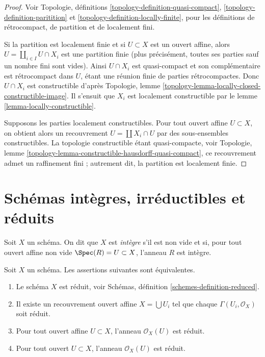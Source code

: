 \begin{proof}
Voir Topologie, définitions
\ref{topology-definition-quasi-compact},
\ref{topology-definition-paritition} et
\ref{topology-definition-locally-finite},
pour les définitions de rétrocompact, de partition et de localement fini.

\medskip\noindent
Si la partition est localement finie et si $U \subset X$ est un
ouvert affine, alors $U = \coprod_{i \in I} U \cap X_i$
est une partition finie (plus précisément, toutes ses parties sauf un nombre
fini sont vides). Ainsi $U \cap X_i$ est quasi-compact
et son complémentaire est rétrocompact dans $U$, étant une réunion finie
de parties rétrocompactes. Donc $U \cap X_i$ est constructible
d'après Topologie, lemme \ref{topology-lemma-locally-closed-constructible-image}.
Il s'ensuit que $X_i$ est localement constructible par le
lemme \ref{lemma-locally-constructible}.

\medskip\noindent
Supposons les parties localement constructibles. Pour tout ouvert
affine $U \subset X$, on obtient alors un recouvrement $U = \coprod X_i \cap U$
par des sous-ensembles constructibles. La topologie constructible étant
quasi-compacte, voir
Topologie, lemme \ref{topology-lemma-constructible-hausdorff-quasi-compact},
ce recouvrement admet un raffinement fini ; autrement dit,
la partition est localement finie.
\end{proof}

\section{Schémas intègres, irréductibles et réduits}
\label{section-integral}

\begin{definition}
\label{definition-integral}
Soit $X$ un schéma. On dit que $X$ est {\it intègre} s'il est non vide et si,
pour tout ouvert affine non vide $\Spec(R) = U \subset X$, l'anneau $R$
est intègre.
\end{definition}

\begin{lemma}
\label{lemma-characterize-reduced}
Soit $X$ un schéma.
Les assertions suivantes sont équivalentes.
\begin{enumerate}
\item Le schéma $X$ est réduit, voir
Schémas, définition \ref{schemes-definition-reduced}.
\item Il existe un recouvrement ouvert affine $X = \bigcup U_i$
tel que chaque $\Gamma(U_i, \mathcal{O}_X)$ soit réduit.
\item Pour tout ouvert affine $U \subset X$, l'anneau
$\mathcal{O}_X(U)$ est réduit.
\item Pour tout ouvert $U \subset X$, l'anneau $\mathcal{O}_X(U)$ est réduit.
\end{enumerate}
\end{lemma}

